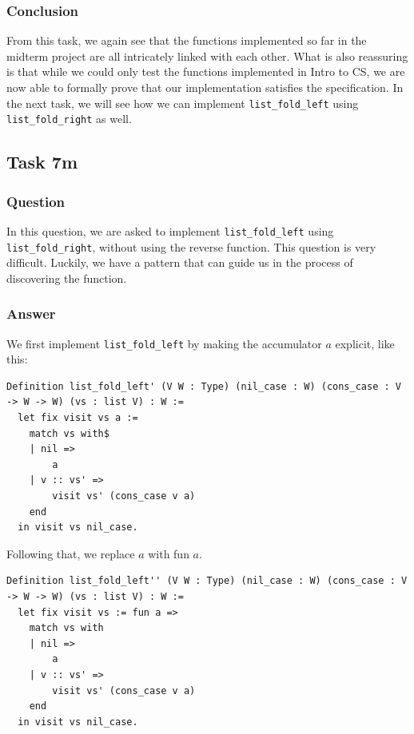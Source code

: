 \documentclass{article}
\begin{document}
\subsubsection{Conclusion}
From this task, we again see that the functions implemented so far in the midterm project are all intricately linked with each other. What is also reassuring is that while we could only test the functions implemented in Intro to CS, we are now able to formally prove that our implementation satisfies the specification. In the next task, we will see how we can implement \texttt{list\_fold\_left}  using \texttt{list\_fold\_right} as well.

\subsection{Task 7m}

\subsubsection{Question}
In this question, we are asked to implement \texttt{list\_fold\_left} using \texttt{list\_fold\_right}, without using the reverse function. This question is very difficult. Luckily, we have a pattern that can guide us in the process of discovering the function. 

\subsubsection{Answer}
We first implement \texttt{list\_fold\_left} by making the accumulator $a$ explicit, like this:

\begin{lstlisting}
Definition list_fold_left' (V W : Type) (nil_case : W) (cons_case : V -> W -> W) (vs : list V) : W :=
  let fix visit vs a :=
    match vs with$
    | nil =>
        a
    | v :: vs' =>
        visit vs' (cons_case v a)
    end
  in visit vs nil_case.
\end{lstlisting}

Following that, we replace $a$ with fun $a$.

\begin{lstlisting}
Definition list_fold_left'' (V W : Type) (nil_case : W) (cons_case : V -> W -> W) (vs : list V) : W :=
  let fix visit vs := fun a =>
    match vs with
    | nil =>
        a
    | v :: vs' =>
        visit vs' (cons_case v a)
    end
  in visit vs nil_case.
\end{lstlisting}
\end{document}
